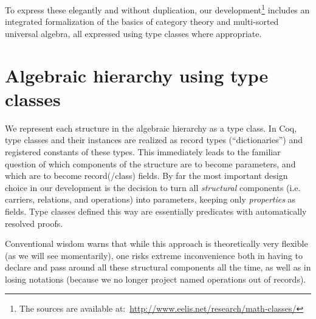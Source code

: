\documentclass{llncs}
\begin{document}
To express these elegantly and without duplication, our development\footnote{The sources are available
at:~\url{http://www.eelis.net/research/math-classes/}} includes an integrated formalization of the basics of category theory and multi-sorted universal algebra, all expressed using type classes where appropriate.



\section{Algebraic hierarchy using type classes}\label{classes}
\vspace*{-2ex}
We represent each structure in the algebraic hierarchy as a type class. In Coq, type classes and their instances are realized as record types (``dictionaries'') and registered constants of these types. This immediately leads to the familiar question of which components of the structure are to become parameters, and which are to become record(/class) fields. By far the most important design choice in our development is the decision to turn all \emph{structural} components (i.e. carriers, relations, and operations) into parameters, keeping only \emph{properties} as fields. Type classes defined this way are essentially predicates with automatically resolved proofs.

Conventional wisdom warns that while this approach is theoretically very flexible (as we will see momentarily), one risks extreme inconvenience both in having to declare and pass around all these structural components all the time, as well as in losing notations (because we no longer project named operations out of records).
\end{document}
